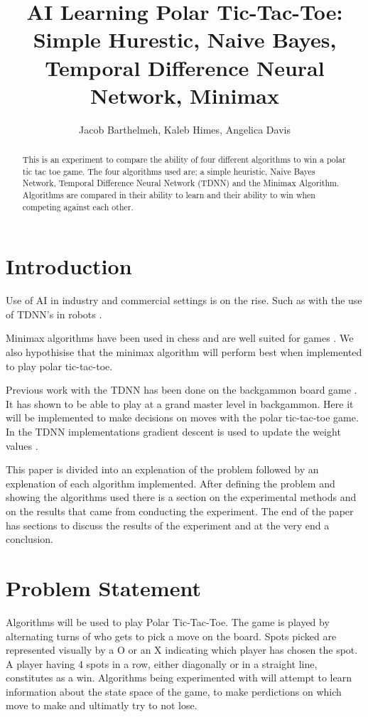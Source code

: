 \documentclass[12pt,letterpaper]{article}
\title{AI Learning Polar Tic-Tac-Toe: \\ Simple Hurestic, Naive Bayes, Temporal Difference Neural Network, Minimax}
\author{Jacob Barthelmeh, Kaleb Himes, Angelica Davis}
\begin{document}
\maketitle

\begin{abstract}
This is an experiment to compare the ability of four different algorithms to win a polar tic tac toe game. The four algorithms used are; a simple heuristic, Naive Bayes Network, Temporal Difference Neural Network (TDNN) and the Minimax Algorithm. Algorithms are compared in their ability to learn and their ability to win when competing against each other.
\end{abstract}

\section{Introduction}
Use of AI in industry and commercial settings is on the rise. Such as with the use of TDNN's in robots 
\cite{robotTDNN}.
 
Minimax algorithms have been used in chess and are well suited for games \cite{flyingMinimax}. We also hypothisise that the minimax algorithm will perform best when implemented to play polar tic-tac-toe.

Previous work with the TDNN has been done on the backgammon board game \cite{stanfordTDNN}. It has shown to be able to play at a grand master level in backgammon. Here it will be implemented to make decisions on moves with the polar tic-tac-toe game. In the TDNN implementations gradient descent is used to update the weight values \cite{gradientTDNN}.

This paper is divided into an explenation of the problem followed by an explenation of each algorithm implemented. After defining the problem and showing the algorithms used there is a section on the experimental methods and on the results that came from conducting the experiment. The end of the paper has sections to discuss the results of the experiment and at the very end a conclusion.


\section{Problem Statement}
Algorithms will be used to play Polar Tic-Tac-Toe. The game is played by alternating turns of who gets to pick a move on the board. Spots picked are represented visually by a O or an X indicating which player has chosen the spot. A player having 4 spots in a row, either diagonally or in a straight line, constitutes as a win. Algorithms being experimented with will attempt to learn information about the state space of the game, to make perdictions on which move to make and ultimatly try to not lose.
\end{document}
